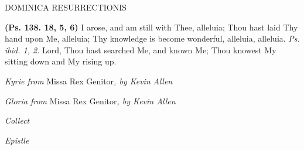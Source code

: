\documentclass[11pt]{article} %
\begin{document}
\begin{center}\begin{huge}
  \textsc{DOMINICA RESURRECTIONIS}
\end{huge}\end{center}

\def\greinitialformat#1{%
  {\fontsize{34}{34}\selectfont #1}%
}




\vskip20pt

\def\greinitialformat#1{%
  {\fontsize{34}{34}\selectfont #1}%
}




\textbf{(Ps. 138. 18, 5, 6)} I arose, and am still with Thee, alleluia; Thou hast laid Thy hand upon Me, alleluia; Thy knowledge is become wonderful, alleluia, alleluia. \emph{Ps. ibid. 1, 2.} Lord, Thou hast searched Me, and known Me; Thou knowest My sitting down and My rising up.

\vskip10pt

\emph{Kyrie from} Missa Rex Genitor\emph{, by Kevin Allen}

\emph{Gloria from} Missa Rex Genitor\emph{, by Kevin Allen}

\emph{Collect}

\emph{Epistle}

\vskip10pt

\def\greinitialformat#1{%
{\fontsize{34}{34}\selectfont #1}%
}

\end{document}
